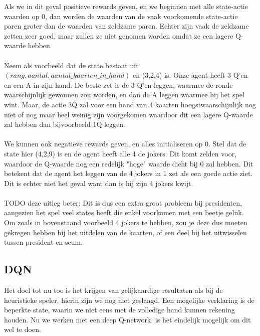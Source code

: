 \documentclass[11pt]{article}
\begin{document}
Als we in dit geval positieve rewards geven, en we beginnen met alle state-actie waarden op 0,  dan worden de waarden van de vaak voorkomende state-actie paren groter dan de waarden van zeldzame paren. Echter zijn vaak de zeldzame zetten zeer goed, maar zullen ze niet genomen worden omdat ze een lagere Q-waarde hebben. \\\\
Neem als voorbeeld dat de state bestaat uit $(rang, aantal, aantal\_kaarten\_in\_hand)$ en (3,2,4) is. Onze agent heeft 3 Q'en en een A in zijn hand. De beste zet is de 3 Q'en leggen, waarmee de ronde waarschijnlijk gewonnen zou worden, en dan de A leggen waarmee hij het spel wint. Maar, de actie 3Q zal voor een hand van 4 kaarten hoogstwaarschijnlijk nog niet of nog maar heel weinig zijn voorgekomen waardoor dit een lagere Q-waarde zal hebben dan bijvoorbeeld 1Q leggen.\\\\
We kunnen ook negatieve rewards geven, en alles initialiseren op 0. Stel dat de state hier (4,2,9) is en de agent heeft alle 4 de jokers. Dit komt zelden voor, waardoor de Q-waarde nog een redelijk "hoge" waarde dicht bij 0 zal hebben. Dit betekent dat de agent het leggen van de 4 jokers in 1 zet als een goede actie ziet. Dit is echter niet het geval want dan is hij zijn 4 jokers kwijt.\\\\
TODO deze uitleg beter: Dit is dus een extra groot probleem bij presidenten, aangezien het spel veel states heeft die enkel voorkomen met een beetje geluk. Om zoals in bovenstaand voorbeeld 4 jokers te hebben, zou je deze dus moeten gekregen hebben bij het uitdelen van de kaarten, of een deel bij het uitwisselen tussen president en scum.

\subsection{DQN}
Het doel tot nu toe is het krijgen van gelijkaardige resultaten als bij de heuristieke speler, hierin zijn we nog niet geslaagd. Een mogelijke verklaring is de beperkte state, waarin we niet eens met de volledige hand kunnen rekening houden. Nu we werken met een deep Q-network, is het eindelijk mogelijk om dit wel te doen.
\end{document}
